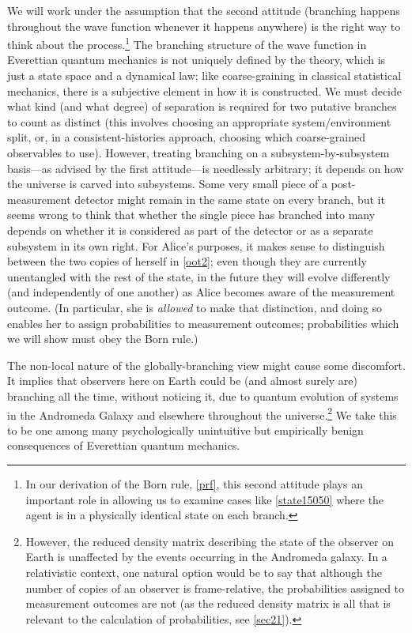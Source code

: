 \documentclass[onecolumn,secnumarabic,amsmath,amssymb,balancelastpage,nofootinbib]{article}
\begin{document}
We will work under the assumption that the second attitude (branching happens throughout the wave function whenever it happens anywhere) is the right way to think about the process.\footnote{In our derivation of the Born rule, \textsection \ref{prf}, this second attitude plays an important role in allowing us to examine cases like \eqref{state15050} where the agent is in a physically identical state on each branch.} The branching structure of the wave function in Everettian quantum mechanics is not uniquely defined by the theory, which is just a state space and a dynamical law; like coarse-graining in classical statistical mechanics, there is a subjective element in how it is constructed.  We must decide what kind (and what degree) of separation is required for two putative branches to count as distinct (this involves choosing an appropriate system/environment split, or, in a consistent-histories approach, choosing which coarse-grained observables to use). However, treating branching on a subsystem-by-subsystem basis---as advised by the first attitude---is needlessly arbitrary; it depends on how the universe is carved into subsystems. Some very small piece of a post-measurement detector might remain in the same state on every branch, but it seems wrong to think that whether the single piece has branched into many depends on whether it is considered as part of the detector or as a separate subsystem in its own right. For Alice's purposes, it makes sense to distinguish between the two copies of herself in \eqref{oot2}; even though they are currently unentangled with the rest of the state, in the future they will evolve differently (and independently of one another) as Alice becomes aware of the measurement outcome. (In particular, she is \emph{allowed} to make that distinction, and doing so enables her to assign probabilities to measurement outcomes; probabilities which we will show must obey the Born rule.)

The non-local nature of the globally-branching view might cause some discomfort. It implies that observers here on Earth could be (and almost surely are) branching all the time, without noticing it, due to quantum evolution of systems in the Andromeda Galaxy and elsewhere throughout the universe.\footnote{However, the reduced density matrix describing the state of the observer on Earth is unaffected by the events occurring in the Andromeda galaxy.  In a relativistic context, one natural option would be to say that although the number of copies of an observer is frame-relative, the probabilities assigned to measurement outcomes are not (as the reduced density matrix is all that is relevant to the calculation of probabilities, see \textsection \ref{sec21}).} We take this to be one among many psychologically unintuitive but empirically benign consequences of Everettian quantum mechanics.
\end{document}
